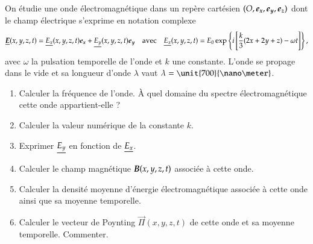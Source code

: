 \begin{exocor}
	On étudie une onde électromagnétique dans un repère cartésien 
	$(O, \ex, \ey, \ez)$ dont le champ électrique 
	s'exprime en notation complexe
	\begin{equation*}
		\complex{\vece}(x, y, z, t) = \complex{E_x}(x, y, z, t) \ex + 
		\complex{E_y}(x, y, z, t)\ey 
		\quad \mathrm{avec} \quad
		\complex{E_x}(x, y, z, t) = E_0 \exp\left\{i
			\left[\dfrac{k}{3}(2x + 2y + z) - \omega t
		\right]\right\},
	\end{equation*}
	avec $\omega$ la pulsation temporelle de l'onde et $k$ une constante.
	L'onde se propage dans le vide et sa longueur d'onde $\lambda$ 
	vaut $\lambda = \unit{700}{\nano \meter}$.
	\begin{enumerate}
		\item Calculer la fréquence de l'onde. À quel domaine du spectre 
		  électromagnétique cette onde appartient-elle ?
		\item Calculer la valeur numérique de la constante $k$.
		\item Exprimer $\underline{E_y}$ en fonction de $\underline{E_x}$.
		\item Calculer le champ magnétique $\vecb(x, y, z, t)$ 
		  associée à cette onde.
		\item Calculer la densité moyenne d'énergie électromagnétique associée
		  à cette onde ainsi que sa moyenne temporelle.
	  \item Calculer le vecteur de Poynting $\vec{\Pi}(x, y, z, t)$ 
		  de cette onde et sa moyenne
		  temporelle. Commenter.
	\end{enumerate}
\end{exocor}

